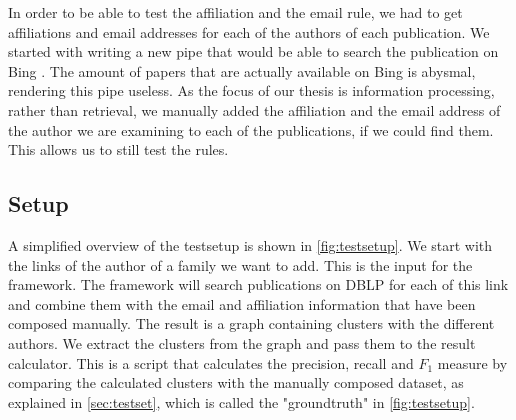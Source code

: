 In order to be able to test the affiliation and the email rule, we had to get affiliations and email addresses for each of the authors of each publication. We started with writing a new pipe that would be able to search the publication on Bing \cite{bing}. The amount of papers that are actually available on Bing is abysmal, rendering this pipe useless. As the focus of our thesis is information processing, rather than retrieval, we manually added the affiliation and the email address of the author we are examining to each of the publications, if we could find them. This allows us to still test the rules.

\subsection{Setup}

A simplified overview of the testsetup is shown in \autoref{fig:testsetup}. We start with the links of the author of a family we want to add. This is the input for the framework. The framework will search publications on DBLP for each of this link and combine them with the email and affiliation information that have been composed manually. The result is a graph containing clusters with the different authors. We extract the clusters from the graph and pass them to the result calculator. This is a script that calculates the precision, recall and $F_{1}$ measure by comparing the calculated clusters with the manually composed dataset, as explained in \autoref{sec:testset}, which is called the "groundtruth" in \autoref{fig:testsetup}.

